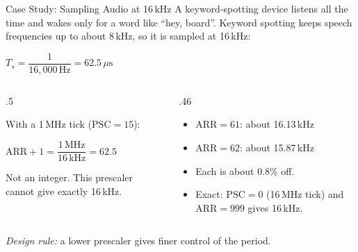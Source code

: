 \documentclass[9pt,aspectratio=169,xcolor=table]{beamer}
\begin{document}
\begin{frame}{Case Study: Sampling Audio at 16\,kHz}
    \leavevmode
    A keyword-spotting device listens all the time and wakes only for a word like ``hey, board''. Keyword spotting keeps speech frequencies up to about 8\,kHz, so it is sampled at \alert{16\,kHz}:

    \vspace{1mm}
    \begin{center}
    $T_s = \dfrac{1}{16{,}000\,\text{Hz}} = 62.5\,\mu\text{s}$
    \end{center}

    \vspace{1mm}
    \begin{columns}[T]
    \begin{column}{.5\textwidth}
        {\small With a 1\,MHz tick ($\text{PSC}=15$):

        $\text{ARR}+1 = \dfrac{1\,\text{MHz}}{16\,\text{kHz}} = 62.5$

        \vspace{1mm}
        Not an integer. This prescaler \alert{cannot} give exactly 16\,kHz.}
    \end{column}
    \begin{column}{.46\textwidth}
        {\small
        \begin{itemize}\itemsep1pt
            \item $\text{ARR}=61$: about 16.13\,kHz
            \item $\text{ARR}=62$: about 15.87\,kHz
            \item Each is about 0.8\% off.
            \item \alert{Exact:} $\text{PSC}=0$ (16\,MHz tick) and $\text{ARR}=999$ gives 16\,kHz.
        \end{itemize}}
    \end{column}
    \end{columns}

    \vspace{2mm}
    {\small \emph{Design rule:} a lower prescaler gives finer control of the period.}
\end{frame}
\end{document}
